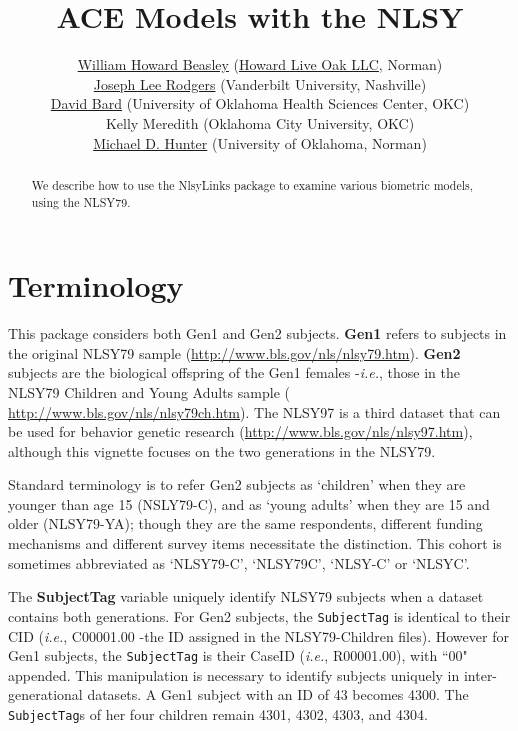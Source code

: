 \documentclass{article}\usepackage[]{graphicx}\usepackage[]{color}
\title{ACE Models with the NLSY}
\author{
  \href{http://scholar.google.com/citations?user=ffsJTC0AAAAJ}{William Howard Beasley} (\href{http://howardliveoak.com/}{Howard Live Oak LLC}, Norman)\\
  \href{http://www.vanderbilt.edu/psychological_sciences/bio/joe-rodgers}{Joseph Lee Rodgers} (Vanderbilt University, Nashville)\\
  \href{http://find.ouhsc.edu/Faculty.aspx?FacultyID=1041}{David Bard} (University of Oklahoma Health Sciences Center, OKC)\\
  Kelly Meredith (Oklahoma City University, OKC)\\
  \href{http://students.ou.edu/H/Michael.D.Hunter-1/}{Michael D. Hunter} (University of Oklahoma, Norman)
}
\begin{document}
\newcommand{\code}[1]{\texttt{\small{#1}}}
\newcommand{\pkg}[1]{\textsf{\small{#1}}}
\newcommand{\R}{\textsf{R}} %

\maketitle

\begin{abstract}
   We describe how to use the \pkg{NlsyLinks} package to examine various biometric models, using the NLSY79.
\end{abstract}
\tableofcontents




\section{Terminology} %
This package considers both Gen1 and Gen2 subjects.  \textbf{Gen1} refers to subjects in the original NLSY79 sample (\url{http://www.bls.gov/nls/nlsy79.htm}).  \textbf{Gen2} subjects are the biological offspring of the Gen1 females -\emph{i.e.}, those in the NLSY79 Children and Young Adults sample ( \url{http://www.bls.gov/nls/nlsy79ch.htm}).  The NLSY97 is a third dataset that can be used for behavior genetic research (\url{http://www.bls.gov/nls/nlsy97.htm}), although this vignette focuses on the two generations in the NLSY79.

Standard terminology is to refer Gen2 subjects as `children' when they are younger than age 15 (NSLY79-C), and as `young adults' when they are 15 and older (NLSY79-YA); though they are the same respondents, different funding mechanisms and different survey items necessitate the distinction.  This cohort is sometimes abbreviated as `NLSY79-C', `NLSY79C', `NLSY-C' or `NLSYC'. 

The \textbf{SubjectTag}\label{term:SubjectTag} variable uniquely identify NLSY79 subjects when a dataset contains both generations.  For Gen2 subjects, the \code{SubjectTag} is identical to their CID (\emph{i.e.}, C00001.00 -the ID assigned in the NLSY79-Children files).  However for Gen1 subjects, the \code{SubjectTag} is their CaseID (\emph{i.e.}, R00001.00), with ``00" appended.  This manipulation is necessary to identify subjects uniquely in inter-generational datasets.  A Gen1 subject with an ID of 43 becomes 4300.  The \code{SubjectTag}s of her four children remain 4301, 4302, 4303, and 4304.
\end{document}
